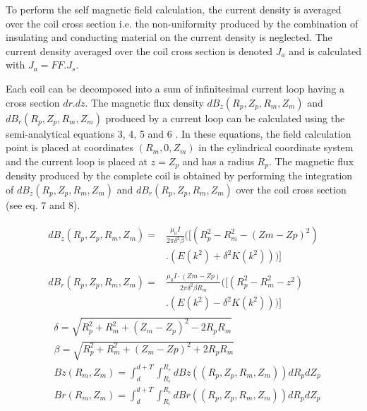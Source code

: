 \documentclass{ws-jmrr}
\begin{document}
\begin{multicols}{2}
To perform the self magnetic field calculation, the current density is averaged over the coil cross section i.e. the non-uniformity produced by the combination of insulating and conducting material on the current density is neglected. The current density averaged over the coil cross section is denoted $J_a$ and is calculated with $J_a=FF.J_s$.\par  
Each coil can be decomposed into a sum of infinitesimal current loop having a cross section $dr.dz$. The magnetic flux density $dB_z(R_p,Z_p,R_m,Z_m)$ and $dB_r(R_p,Z_p,R_m,Z_m)$ produced by a current loop can be calculated using the semi-analytical equations 3, 4, 5 and 6 \cite{simpson2001simple}. In these equations, the field calculation point is placed at coordinates $(R_m,0,Z_m)$ in the cylindrical coordinate system and the current loop is placed at $z=Z_p$ and has a radius $R_p$. The magnetic flux density produced by the complete coil is obtained by performing the integration of $dB_z(R_p,Z_p,R_m,Z_m)$ and $dB_r(R_p,Z_p,R_m,Z_m)$ over the coil cross section (see eq. 7 and 8).

\begin{align}
\begin{split}
dB_z(R_p,Z_p,R_m,Z_m) =&\frac{\mu _0I}{2\pi\delta ^{2}\beta  }( [ \left ( R_p^2-R_m ^2-(Zm-Zp)^2 \right )\\
&.(E(k^2)+\delta ^2K(k^2)) ) ]
\end{split}
\label{Bz1loop}\\
\begin{split}
dB_r(R_p,Z_p,R_m,Z_m) =&\frac{\mu _0 I \cdot (Zm-Zp)}{2\pi\delta ^{2}\beta R_m   }( [ \left ( R_p^2-R_m ^2-z^2 \right )\\
&.(E(k^2)-\delta ^2K(k^2))) ]
\end{split}
\end{align}
\begin{align}
&\delta =\sqrt{R_p^2+R_m^2+(Z_m-Z_p)^2-2R_pR_m}
\label{delta}\\
&\beta =\sqrt{R_p^2+R_m^2+(Z_m-Zp)^2+2R_pR_m}
\label{beta}\\
&Bz(R_m,Z_m)=\int_{d}^{d+T}\int_{R_i}^{R_e}dBz((R_p,Z_p,R_m,Z_m))dR_pdZ_p\\
&Br(R_m,Z_m)=\int_{d}^{d+T}\int_{R_i}^{R_e}dBr((R_p,Z_p,R_m,Z_m))dR_pdZ_p
\end{align}


\end{multicols}
\end{document}
